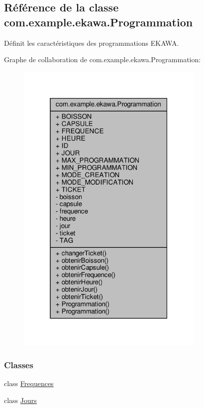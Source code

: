 \hypertarget{classcom_1_1example_1_1ekawa_1_1_programmation}{}\subsection{Référence de la classe com.\+example.\+ekawa.\+Programmation}
\label{classcom_1_1example_1_1ekawa_1_1_programmation}


Définit les caractéristiques des programmations E\+K\+A\+WA.  




Graphe de collaboration de com.\+example.\+ekawa.\+Programmation\+:\nopagebreak
\begin{figure}[H]
\begin{center}
\leavevmode
\includegraphics[width=256pt]{classcom_1_1example_1_1ekawa_1_1_programmation__coll__graph}
\end{center}
\end{figure}
\subsubsection*{Classes}
\begin{DoxyCompactItemize}
\item 
class \hyperlink{classcom_1_1example_1_1ekawa_1_1_programmation_1_1_frequences}{Frequences}
\item 
class \hyperlink{classcom_1_1example_1_1ekawa_1_1_programmation_1_1_jours}{Jours}
\end{DoxyCompactItemize}
